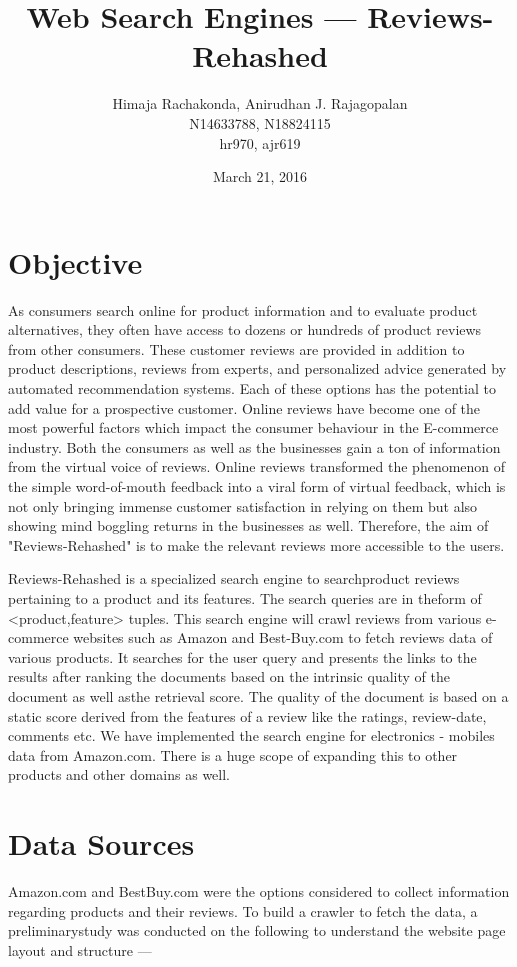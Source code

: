 \documentclass{article}
\begin{document}
\title{Web Search Engines --- Reviews-Rehashed}
\date{March 21, 2016}
\author{Himaja Rachakonda, Anirudhan J. Rajagopalan\\ N14633788, N18824115\\ hr970, ajr619}
\maketitle
\newpage

\section{Objective}

As consumers search online for product information and to evaluate product alternatives, they often have access to dozens or hundreds of product reviews from other consumers. These customer reviews are provided in addition to product descriptions, reviews from experts, and personalized advice generated by automated recommendation systems. Each of these options has the potential to add value for a prospective customer. Online reviews have become one of the most powerful factors which impact the consumer behaviour in the E-commerce industry. Both the consumers as well as the businesses gain a ton of information from the virtual voice of reviews. Online reviews transformed the phenomenon of the simple word-of-mouth feedback into a viral form of virtual feedback, which is not only bringing immense customer satisfaction in relying on them but also showing mind boggling returns in the businesses as well. Therefore, the aim of "Reviews-Rehashed" is to make the relevant reviews more accessible to the users. 

Reviews-Rehashed is a specialized search engine to searchproduct reviews pertaining to a product and its features. The search queries are in theform of <product,feature> tuples. This search engine will crawl reviews from various e-commerce websites such as Amazon and Best-Buy.com to fetch reviews data of various products. It searches for the user query and presents the links to the results after ranking the documents based on the intrinsic quality of the document as well asthe retrieval score. The quality of the document is based on a static score derived from the features of a review like the ratings, review-date, comments etc. We have implemented the search engine for electronics - mobiles data from Amazon.com. There is a huge scope of expanding this to other products and other domains as well.

\section{Data Sources}
Amazon.com and BestBuy.com were the options considered to collect information regarding products and their reviews. To build a crawler to fetch the data, a preliminarystudy was conducted on the following to understand the website page layout and structure ---
\end{document}

